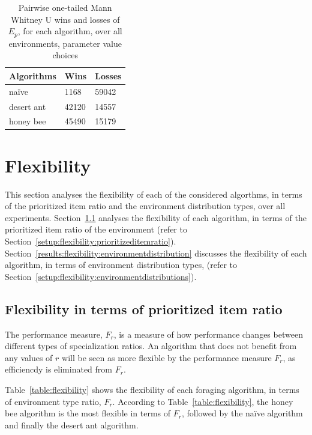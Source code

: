\begin{table}[]
\centering
\caption{Pairwise one-tailed Mann Whitney U wins and losses of $E_p$, for each algorithm, over all environments, parameter value choices }
\label{summarytable}
\begin{tabular}{@{}lll@{}}
\toprule
\textbf{Algorithms} & \textbf{Wins} & \textbf{Losses} \\ \midrule
na\"ive               & 1168          & 59042           \\
desert ant          & 42120         & 14557           \\
honey bee           & 45490         & 15179           \\ \bottomrule
\end{tabular}
\end{table}

\section{Flexibility}
\label{results:flexibility}

This section analyses the flexibility of each of the considered algorthms, in terms of the prioritized item ratio and the environment distribution types, over all experiments. Section~\ref{results:prioritizeditemratio} analyses the flexibility of each algorithm, in terms of the prioritized item ratio of the environment (refer to Section~\ref{setup:flexibility:prioritizeditemratio}). Section~\ref{results:flexibility:environmentdistribution} discusses the flexibility of each algorithm, in terms of environment distribution types, (refer to Section~\ref{setup:flexibility:environmentdistributions}).

\subsection{Flexibility in terms of prioritized item ratio}
\label{results:prioritizeditemratio}

The performance measure, $F_r$, is a measure of how performance changes between different types of specialization ratios. An algorithm that does not benefit from any values of $r$ will be seen as more flexible by the performance measure $F_r$, as efficiencdy is eliminated from $F_r$.

Table~\ref{table:flexibility} shows the flexibility of each foraging algorithm, in terms of environment type ratio, $F_r$. According to Table~\ref{table:flexibility}, the honey bee algorithm is the most flexible in terms of $F_r$, followed by the na\"ive algorithm and finally the desert ant algorithm. 

